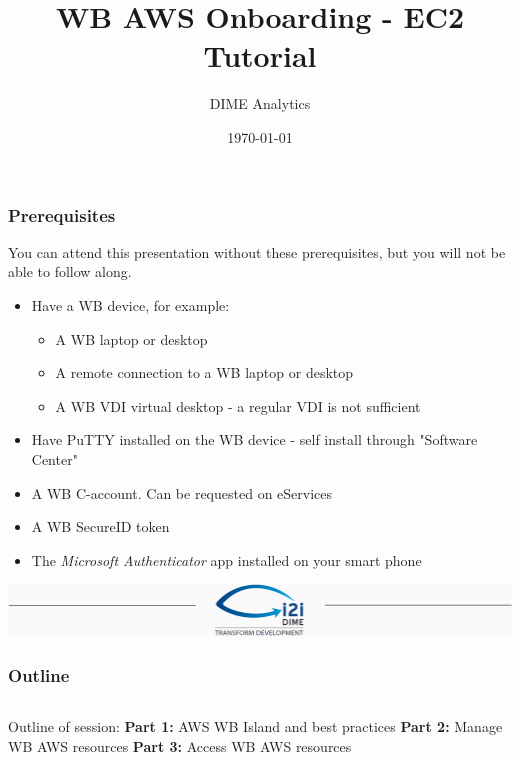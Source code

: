 \documentclass[aspectratio=169]{beamer} %
\title{WB AWS Onboarding - EC2 Tutorial}
\author{DIME Analytics}
\institute{DIME - The World Bank - \trainingURL{https://www.worldbank.org/en/research/dime}}
\date{\today}
\begin{document}
\begin{frame}
	\frametitle{Prerequisites}

		You can attend this presentation without these prerequisites, but you will not be able to follow along.

		\begin{itemize}
			\setlength\itemsep{.8em}
			\item Have a WB device, for example:
			\begin{itemize}
				\item A WB laptop or desktop
				\item A remote connection to a WB laptop or desktop
				\item A WB VDI virtual desktop - a regular VDI is not sufficient
			\end{itemize}
			\item Have PuTTY installed on the WB device - self install through "Software Center"
			\item A WB C-account. Can be requested on eServices
			\item A WB SecureID token
			\item The \textit{Microsoft Authenticator} app installed on your smart phone
		\end{itemize}
\end{frame}

\begin{frame}
	\includegraphics[width=\textwidth]{img/Header.png}
	\vspace{-0.2cm}
	\titlepage 	 %
\end{frame}

\begin{frame}
	\frametitle{Outline}

	\begin{columns}[c]
		\Huge Outline of session:
		\vspace{.7cm}\newline
		\large \textbf{Part 1:} AWS WB Island and best practices
		\vspace{.7cm}\newline
		\large \textbf{Part 2:} Manage WB AWS resources
		\vspace{.7cm}\newline
		\large \textbf{Part 3:} Access WB AWS resources

	\end{columns}
\end{frame}
\end{document}
